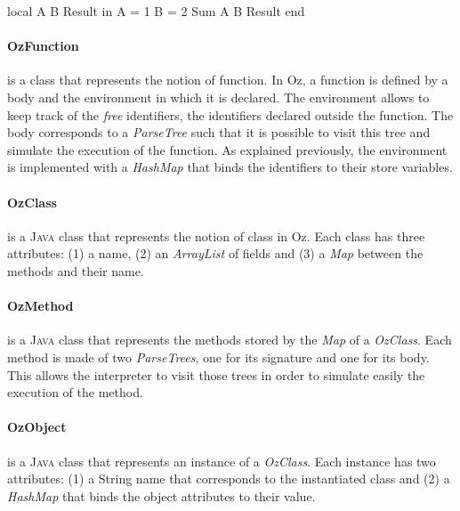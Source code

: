 \documentclass[11pt,a4paper,twoside,openright]{report}
\begin{document}
 \begin{OZ}
    local A B Result in
      A = 1
      B = 2
      {Sum A B Result}
    end
 \end{OZ}
 \label{fig:ozarg}

\paragraph{OzFunction}
is a class that represents the notion of function. In Oz, a function is defined 
by a body and the environment in which it is declared. The environment allows 
to keep track of the \textit{free} identifiers, the identifiers declared 
outside the function. The body corresponds to a \textit{ParseTree} such that it 
is possible to visit this tree and simulate the execution of the function. As 
explained previously, the environment is implemented with a \textit{HashMap} 
that binds the identifiers to their store variables.


\paragraph{OzClass}
is a \textsc{Java} class that represents the notion of class in Oz. Each class 
has three attributes: (1) a name, (2) an \textit{ArrayList} of fields and 
(3) a \textit{Map} between the methods and their name.


\paragraph{OzMethod}
is a \textsc{Java} class that represents the methods stored by the \textit{Map} 
of a \textit{OzClass}. Each method is made of two \textit{ParseTrees}, one for 
its signature and one for its body. This allows the interpreter to visit those 
trees in order to simulate easily the execution of the method.


\paragraph{OzObject}
is a \textsc{Java} class that represents an instance of a \textit{OzClass}. 
Each instance has two attributes: (1) a String name that corresponds to the 
instantiated class and (2) a \textit{HashMap} that binds the object attributes 
to their value.
\end{document}
